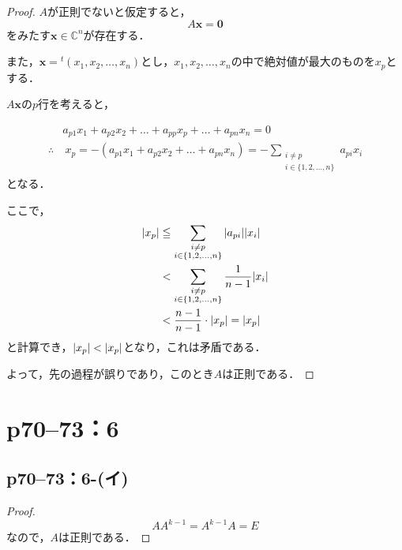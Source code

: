 \documentclass[a4paper,10pt,fleqn]{ltjsarticle}
\begin{document}
\begin{leftbar}
  \begin{proof}
    $A$が正則でないと仮定すると，
    \[
      A \bm{x} = \bm{0}
    \]
    をみたす$\bm{x} \in \mathbb{C}^n$が存在する．

    また，$\bm{x} ={} ^t (x_1,x_2,\dots,x_n)$とし，$x_1,x_2,\dots,x_n$の中で絶対値が最大のものを$x_p$とする．

    $A \bm{x}$の$p$行を考えると，

    \begin{align*}
                 & a_{p1} x_1 + a_{p2} x_2 + \dots + a_{pp} x_p + \dots + a_{pn} x_n = 0            \\
      \therefore & ~ x_p = -(a_{p1}x_1 + a_{p2} x_2+ \dots + a_{pn} x_n) =- \sum_{\substack{i \ne p \\ i \in \{1,2,\dots,n\}}} a_{pi} x_i
    \end{align*}
    となる．

    ここで，
    \begin{align*}
      \abs{x_p} & \leqq \sum_{\substack{i \ne p                \\ i \in \{1,2,\dots,n\}}} \abs{a_{pi}} \abs{x_i} \\
                & < \sum_{\substack{i \ne p                    \\ i \in \{1,2,\dots,n\}}} \frac{1}{n-1} \abs{x_i} \\
                & < \frac{n-1}{n-1} \cdot \abs{x_p} =\abs{x_p}
    \end{align*}
    と計算でき，$ \abs{x_p} < \abs{x_p}$となり，これは矛盾である．

    よって，先の過程が誤りであり，このとき$A$は正則である．
  \end{proof}
\end{leftbar}
\newpage

\section*{p70--73：6}

\subsection*{p70--73：6-(イ)}
\begin{tleftbar}
  \begin{proof}
    \[
      A A^{k-1} = A^{k-1} A = E
    \]
    なので，$A$は正則である．
  \end{proof}
\end{tleftbar}
\end{document}
